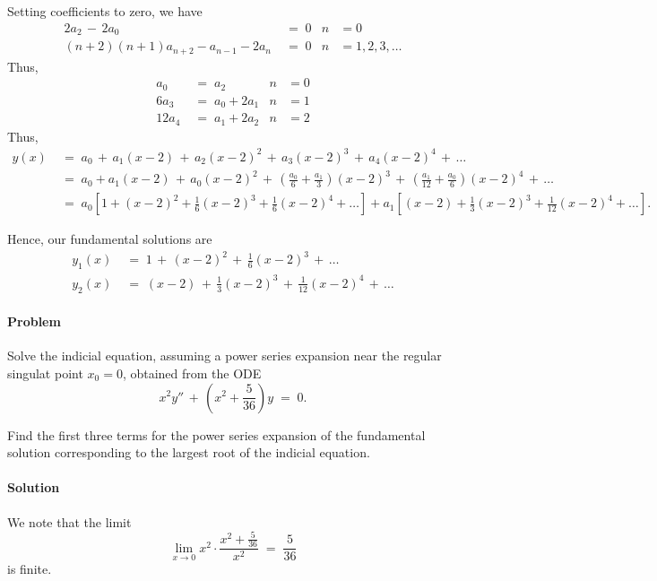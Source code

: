 \documentclass[10pt]{article}
\newcounter{prob}
\def\problem{\stepcounter{prob}\paragraph{Problem \arabic{prob}}}
\def\solution{\paragraph{Solution}}
\begin{document}
        Setting coefficients to zero, we have
        \begin{align*}
                2a_2 \,-\, 2a_0 \;&=\; 0       & n &= 0 \\
                (n+2)(n+1)a_{n + 2} - a_{n - 1} - 2a_n \;&=\; 0         & n &= 1, 2, 3, \dots
        \end{align*}
        Thus,
        \begin{align*}
                a_0 \;&=\; a_2          &n&=0\\
                6a_3 \;&=\; a_0 + 2a_1      &n& = 1\\
                12a_4 \;&=\; a_1 + 2a_2     &n& = 2
        \end{align*}
        Thus,
        \begin{align*}
                y(x) \;&=\; a_0 \,+\, a_1(x-2) \,+\, a_2(x-2)^2 \,+\, a_3(x-2)^3 \,+\, a_4(x-2)^4 \,+\, \dots\\
                        \;&=\; a_0 + a_1(x-2) \,+\, a_0(x-2)^2 \,+\, \left( \frac{a_0}{6} + \frac{a_1}{3}\right)(x-2)^3 \,+\, 
                                \left( \frac{a_1}{12} + \frac{a_0}{6} \right)(x-2)^4 \,+\, \dots \\
                        \;&=\; a_0 \left[1 + (x - 2)^2 + \frac{1}{6}(x-2)^3 + \frac{1}{6}(x-2)^4 + \dots\right] + 
                                a_1\left[(x-2) + \frac{1}{3}(x-2)^3 + \frac{1}{12}(x-2)^4 + \dots\right].
        \end{align*}

        Hence, our fundamental solutions are
        \begin{align*}
                y_1(x) \;&=\; 1 \,+\, (x-2)^2 \,+\, \frac{1}{6}(x-2)^3 \,+\, \dots\\
                y_2(x) \;&=\; (x-2) \,+\, \frac{1}{3}(x-2)^3 \,+\, \frac{1}{12}(x-2)^4 \,+\, \dots
        \end{align*}

        
        \problem Solve the indicial equation, assuming a power series expansion near the regular singulat point $x_0=0$, obtained from the ODE
        \[
                x^2 y'' \,+\, \left(x^2 + \frac{5}{36}\right)y \;=\; 0.
        \]

        Find the first three terms for the power series expansion of the fundamental solution corresponding to the largest root of the 
        indicial equation.

        \solution
        We note that the limit
        \[
        \lim_{x \to 0} x^2 \cdot\frac{x^2 + \frac{5}{36}}{x^2} \;=\; \frac{5}{36}
        \]
        is finite.
\end{document}
